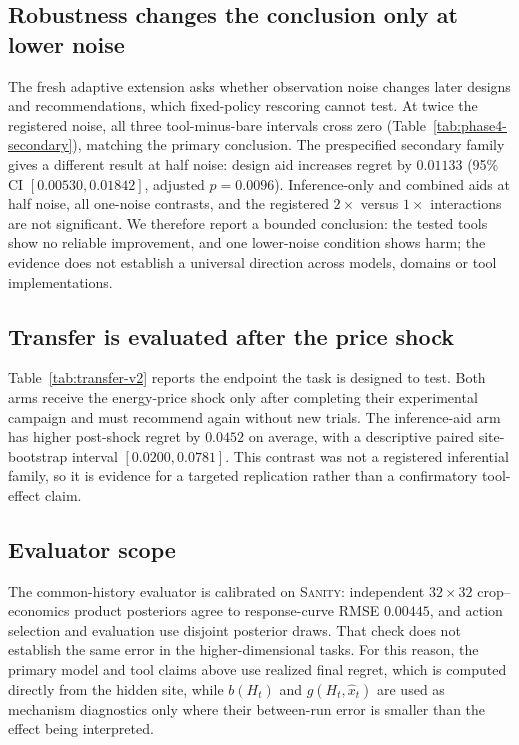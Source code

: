 \subsection{Robustness changes the conclusion only at lower noise}

The fresh adaptive extension asks whether observation noise changes later designs and
recommendations, which fixed-policy rescoring cannot test. At twice the registered noise,
all three tool-minus-bare intervals cross zero (Table~\ref{tab:phase4-secondary}), matching
the primary conclusion. The prespecified secondary family gives a different result at half
noise: design aid increases regret by $0.01133$ (95\% CI $[0.00530,0.01842]$, adjusted
$p=0.0096$). Inference-only and combined aids at half noise, all one-noise contrasts, and
the registered $2\times$ versus $1\times$ interactions are not significant. We therefore
report a bounded conclusion: the tested tools show no reliable improvement, and one
lower-noise condition shows harm; the evidence does not establish a universal direction
across models, domains or tool implementations.

\subsection{Transfer is evaluated after the price shock}



Table~\ref{tab:transfer-v2} reports the endpoint the task is designed to test. Both arms
receive the energy-price shock only after completing their experimental campaign and must
recommend again without new trials. The inference-aid arm has higher post-shock regret by
$0.0452$ on average, with a descriptive paired site-bootstrap interval
$[0.0200,0.0781]$. This contrast was not a registered inferential family, so it is evidence
for a targeted replication rather than a confirmatory tool-effect claim.

\subsection{Evaluator scope}

The common-history evaluator is calibrated on \textsc{Sanity}: independent $32\times32$
crop--economics product posteriors agree to response-curve RMSE $0.00445$, and action
selection and evaluation use disjoint posterior draws. That check does not establish the
same error in the higher-dimensional tasks. For this reason, the primary model and tool
claims above use realized final regret, which is computed directly from the hidden site,
while $b(H_t)$ and $g(H_t,\hat x_t)$ are used as mechanism diagnostics only where their
between-run error is smaller than the effect being interpreted.
